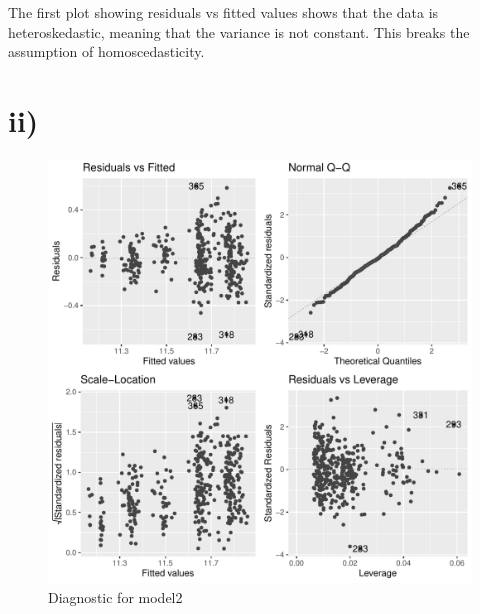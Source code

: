 \documentclass[
]{article}
\newenvironment{Shaded}{\begin{snugshade}}{\end{snugshade}}
\newcommand{\AttributeTok}[1]{\textcolor[rgb]{0.77,0.63,0.00}{#1}}
\newcommand{\ConstantTok}[1]{\textcolor[rgb]{0.00,0.00,0.00}{#1}}
\newcommand{\FunctionTok}[1]{\textcolor[rgb]{0.00,0.00,0.00}{#1}}
\newcommand{\NormalTok}[1]{#1}
\newcommand{\OtherTok}[1]{\textcolor[rgb]{0.56,0.35,0.01}{#1}}
\newcommand{\SpecialCharTok}[1]{\textcolor[rgb]{0.00,0.00,0.00}{#1}}
\begin{document}
The first plot showing residuals vs fitted values shows that the data is
heteroskedastic, meaning that the variance is not constant. This breaks
the assumption of homoscedasticity.

\hypertarget{ii-1}{%
\section{ii)}\label{ii-1}}

\begin{Shaded}
\end{Shaded}

\begin{figure}

{\centering \includegraphics[width=0.7\linewidth]{Exercise1_files/figure-latex/fig_model_check-1} 

}

\caption{Diagnostic for model2}\label{fig:fig_model_check}
\end{figure}
\end{document}
